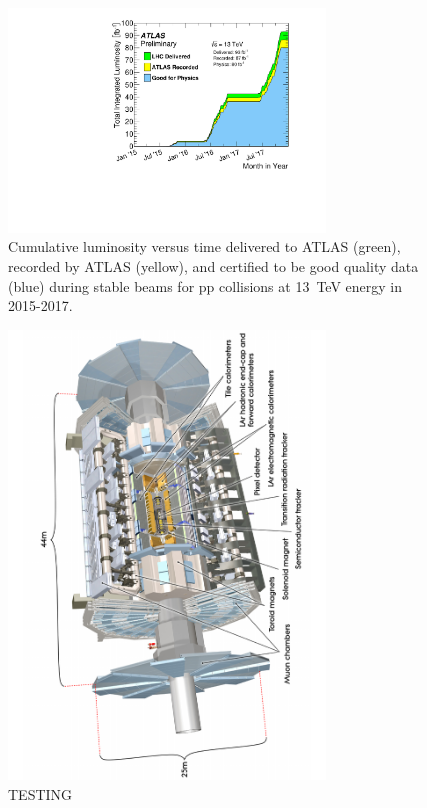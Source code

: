 \begin{figure}[tp]
	\centering
	\includegraphics[width=0.75\textwidth]{LHC_ATLAS/intlumivstimeRun2DQ.pdf}
	\caption{Cumulative luminosity versus time delivered to ATLAS (green), recorded by ATLAS (yellow), and certified to be good quality data (blue) during stable beams for pp collisions at \SI{13}{TeV} \cm energy in 2015-2017.}
\end{figure}
\begin{figure}[tp]
	\centering
	\includegraphics[width=0.75\textwidth]{LHC_ATLAS/0803012_01}
	\caption{TESTING}	
\end{figure}







